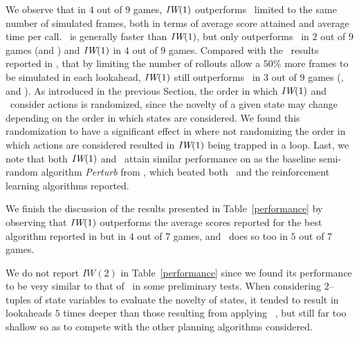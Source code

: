 We observe that in $4$ out of $9$ games, ${\textit{IW}}(1)$ outperforms \UCT~limited to the same number
of simulated frames, both in terms of average score attained and average time per call. \BFS~is
generally faster than ${\textit{IW}}(1)$, but only outperforms \UCT~in $2$ out of $9$ games (\Freeway and
\Seaquest) and ${\textit{IW}}(1)$ in $4$ out of $9$ games. Compared with the \UCT~results reported
in \cite{bellemare:jair2013}, that by limiting the number of rollouts allow a $50$\% more frames
to be simulated in each lookahead, ${\textit{IW}}(1)$ still outperforms \UCT~in $3$ out of $9$ games
(\Breakout, \Enduro and \Freeway). As introduced in the previous Section, the order in which
${\textit{IW}}(1)$ and \BFS~consider actions is randomized, since the novelty of a given state may
change depending on the order in which states are considered. We found this randomization to
have a significant effect in \Qbert where not randomizing the order in which actions are considered
resulted in ${\textit{IW}}(1)$ being trapped in a loop. Last, we note that both ${\textit{IW}}(1)$ and \BFS~attain similar 
performance on \Freeway as the baseline semi-random algorithm \emph{Perturb} 
from \cite{bellemare:jair2013}, which beated both \UCT~and the reinforcement learning algorithms reported.

We finish the discussion of the results presented in Table~\ref{performance} by observing
that ${\textit{IW}}(1)$ outperforms the average scores reported for the best algorithm reported in
\cite{deep-mind-atari} but in $4$ out of $7$ games, and \BFS~does so too in $5$ out of $7$
games.

We do not report $IW(2)$ in Table~\ref{performance} since we found its performance to
be very similar to that of \BRFS~in some preliminary tests. When considering $2$--tuples
of state variables to evaluate the novelty of states, it tended to result in lookaheads
$5$ times deeper than those resulting from applying \BRFS~, but still far too shallow so
as to compete with the other planning algorithms considered.

